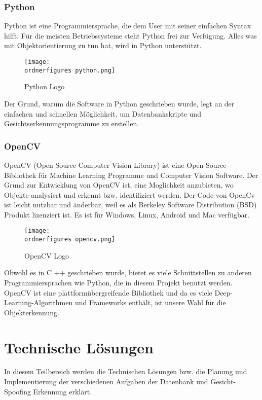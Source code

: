 \subsubsection{Python}
Python ist eine Programmiersprache, die dem User mit seiner einfachen Syntax hilft. Für die meisten Betriebssysteme steht Python frei zur Verfügung. Alles was mit Objektorientierung zu tun hat, wird in Python unterstützt.\cite{pythonInfo}
\begin{figure}[ht]
	\centering
	\texttt{[image: \\ordnerfigures python.png]}
	\caption{ Python Logo \cite{Pythonlogo}}
	\label{fig:python}
\end{figure}
\bigbreak
Der Grund, warum die Software in Python geschrieben wurde, legt an der einfachen und schnellen Möglichkeit, um Datenbankskripte und Gesichtserkennungsprogramme zu erstellen.
\subsubsection{OpenCV}
OpenCV (Open Source Computer Vision Library) ist eine Open-Source-Bibliothek für Machine Learning Programme und Computer Vision Software. Der Grund zur Entwicklung von OpenCV ist, eine Moglichkeit anzubieten, wo Objekte analysiert und erkennt bzw. identifiziert werden. Der Code von OpenCv ist leicht nutzbar und änderbar, weil es als Berkeley Software Distribution (BSD) Produkt lizenziert ist. Es ist für Windows, Linux, Android und Mac verfügbar.\cite{OpenCV1}
\begin{figure}[ht]
	\centering
	\texttt{[image: \\ordnerfigures opencv.png]}
	\caption{ OpenCV Logo \cite{OpenCVlogo}}
	\label{fig:opencv}
\end{figure}
\bigbreak
Obwohl es in C ++ geschrieben wurde, bietet es viele Schnittstellen zu anderen Programmiersprachen wie Python, die in diesem Projekt benutzt werden. OpenCV ist eine plattformübergreifende Bibliothek und da es viele Deep-Learning-Algorithmen und Frameworks enthält, ist unsere Wahl für die Objekterkennung.
\newpage
\section{Technische Lösungen}
In diesem Teilbereich werden die Technischen Lösungen bzw. die Planung und Implementierung der verschiedenen Aufgaben der Datenbank und Gesicht-Spoofing Erkennung erklärt.
